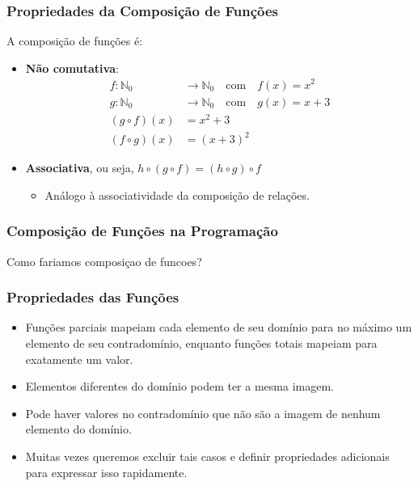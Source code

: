 \begin{frame}
  \frametitle{Propriedades da Composição de Funções}

  A composição de funções é:
  \begin{itemize}
    \item \textbf{Não comutativa}:
    \begin{align*}
      f : \mathbb{N}_0 &\to \mathbb{N}_0 \quad \text{com} \quad f(x) = x^2 \\
      g : \mathbb{N}_0 &\to \mathbb{N}_0 \quad \text{com} \quad g(x) = x + 3 \\
      (g \circ f)(x) &= x^2 + 3 \\
      (f \circ g)(x) &= (x + 3)^2
    \end{align*}
    
    \item \textbf{Associativa}, ou seja, \( h \circ (g \circ f) = (h \circ g) \circ f \)
    \begin{itemize}
      \item Análogo à associatividade da composição de relações.
    \end{itemize}
  \end{itemize}
\end{frame}

\begin{frame}
  \frametitle{Composição de Funções na Programação}

  
  Como fariamos composiçao de funcoes?
  
\end{frame}

\begin{frame}
  \frametitle{Propriedades das Funções}

  \begin{itemize}
    \item Funções parciais mapeiam cada elemento de seu domínio para no máximo um elemento de seu contradomínio, enquanto funções totais mapeiam para exatamente um valor.
    \item Elementos diferentes do domínio podem ter a mesma imagem.
    \item Pode haver valores no contradomínio que não são a imagem de nenhum elemento do domínio.
    \item Muitas vezes queremos excluir tais casos e definir propriedades adicionais para expressar isso rapidamente.
  \end{itemize}
\end{frame}



